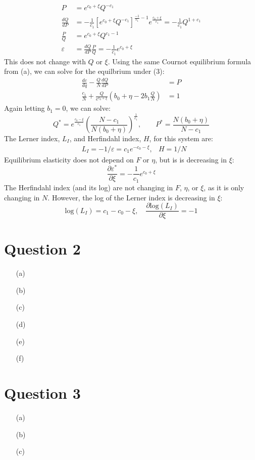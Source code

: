 \documentclass{article}
\newcommand{\loge}[1]{\text{log}\left(#1\right)}
\newcommand{\pl}{\partial}
\begin{document}
\begin{itemize}
\begin{align*}
      P &= e^{c_0 + \xi}Q^{-c_1}  \\
      \frac{dQ}{dP} &= -\frac{1}{c_1}\left[e^{c_0 + \xi}Q^{-c_1}\right]^{\frac{-1}{c_1}-1}e^{\frac{c_0+\xi}{c_1}} = -\frac{1}{c_1}Q^{1+c_1} \\
      \frac{P}{Q} &= e^{c_0 + \xi}Q^{c_1-1}     \\
      \varepsilon &= \frac{dQ}{dP}\frac{P}{Q} = -\frac{1}{c_1}e^{c_0 + \xi}
    \end{align*}
    This does not change with $Q$ or $\xi$. Using the same Cournot equilibrium formula from (a), we can solve for the equilbrium under (3):\begin{align*}
      \frac{dc}{dq} - \frac{Q}{N}\frac{dQ}{dP} &= P \\
      \frac{c_1}{N} + \frac{Q}{e^{c_0 + \xi}}\left(b_0+\eta-2b_1\frac{Q}{N}\right) &= 1
    \end{align*}
    Again letting ${b_1=0}$, we can solve:\[
      Q^* = e^{\frac{c_0-\xi}{c_1}}\left(\frac{N-c_1}{N(b_0+\eta)}\right)^\frac{1}{c_1}, \quad\quad 
      P^* = \frac{N(b_0+\eta)}{N-c_1}
    \]
    The Lerner index, $L_I$, and Herfindahl index, $H$, for this system are:\begin{align*}
      &L_I = -1/\varepsilon = c_1e^{-c_0-\xi}, &H = 1/N
    \end{align*}
    Equilibrium elasticity does not depend on $F$ or $\eta$, but is is decreasing in $\xi$:\[
      \frac{\pl\varepsilon^*}{\pl\xi} = -\frac{1}{c_1}e^{c_0 + \xi}
    \]
    The Herfindahl index (and its log) are not changing in $F$, $\eta$, or $\xi$, as it is only changing in $N$. However, the log of the Lerner index is decreasing in $\xi$:\[
      \loge{L_I} = c_1 - c_0 - \xi,\quad \frac{\pl\loge{L_I}}{\pl\xi} = -1
    \]
\end{itemize}

\section*{Question 2}
\begin{itemize}
    \item[(a)]
    \item[(b)]
    \item[(c)]
    \item[(d)]
    \item[(e)]
    \item[(f)]
\end{itemize}


\section*{Question 3}
\begin{itemize}
    \item[(a)]
    \item[(b)]
    \item[(c)]
\end{itemize}

\end{document}
